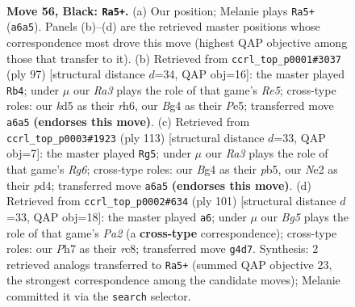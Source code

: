 \documentclass[11pt]{article}
\begin{document}
\clearpage

\begin{figure}[p]\centering
\begin{subfigure}{0.46\textwidth}\centering
\resizebox{\linewidth}{!}{%
\newchessgame
\chessboard[
  setfen={8/7p/r4k2/3Kp3/1p4b1/8/4n1r1/8 b - - 3 56},
  showmover=false,
  pgfstyle=straightmove, color=movearrow, markmove={a6-a5}
]}
\caption{}
\end{subfigure}\hfill
\begin{subfigure}{0.46\textwidth}\centering
\resizebox{\linewidth}{!}{%
\newchessgame
\chessboard[
  setfen={8/1P6/7R/4p2p/4r1k1/8/5K2/8 b - - 0 49},
  showmover=false,
  pgfstyle=straightmove, color=movearrow, markmove={e4-b4}
]}
\caption{}
\end{subfigure}
\\[4pt]
\begin{subfigure}{0.46\textwidth}\centering
\resizebox{\linewidth}{!}{%
\newchessgame
\chessboard[
  setfen={8/5pk1/8/1P5p/3P4/6rp/2K5/7R b - - 1 57},
  showmover=false,
  pgfstyle=straightmove, color=movearrow, markmove={g3-g5}
]}
\caption{}
\end{subfigure}\hfill
\begin{subfigure}{0.46\textwidth}\centering
\resizebox{\linewidth}{!}{%
\newchessgame
\chessboard[
  setfen={2R5/p4rk1/8/7P/5p2/5K2/8/8 b - - 2 51},
  showmover=false,
  pgfstyle=straightmove, color=movearrow, markmove={a7-a6}
]}
\caption{}
\end{subfigure}
\caption{\textbf{Move 56, Black: \texttt{Ra5+}.} (a) Our position; Melanie plays \texttt{Ra5+} (\texttt{a6a5}). Panels (b)--(d) are the retrieved master positions whose correspondence most drove this move (highest QAP objective among those that transfer to it). (b) Retrieved from \texttt{ccrl\_top\_p0001\#3037} (ply 97) [structural distance $d$=34, QAP obj=16]: the master played \texttt{Rb4}; under $\mu$ our \emph{Ra3} plays the role of that game's \emph{Re5}; cross-type roles: our \emph{k}d5 as their \emph{r}h6, our \emph{B}g4 as their \emph{P}e5; transferred move \texttt{a6a5} \textbf{(endorses this move)}. (c) Retrieved from \texttt{ccrl\_top\_p0003\#1923} (ply 113) [structural distance $d$=33, QAP obj=7]: the master played \texttt{Rg5}; under $\mu$ our \emph{Ra3} plays the role of that game's \emph{Rg6}; cross-type roles: our \emph{B}g4 as their \emph{p}b5, our \emph{N}e2 as their \emph{p}d4; transferred move \texttt{a6a5} \textbf{(endorses this move)}. (d) Retrieved from \texttt{ccrl\_top\_p0002\#634} (ply 101) [structural distance $d$=33, QAP obj=18]: the master played \texttt{a6}; under $\mu$ our \emph{Bg5} plays the role of that game's \emph{Pa2} (a \textbf{cross-type} correspondence); cross-type roles: our \emph{P}h7 as their \emph{r}c8; transferred move \texttt{g4d7}. Synthesis: 2 retrieved analogs transferred to \texttt{Ra5+} (summed QAP objective 23, the strongest correspondence among the candidate moves); Melanie committed it via the \texttt{search} selector.}
\label{fig:thought-m111}
\end{figure}
\end{document}
